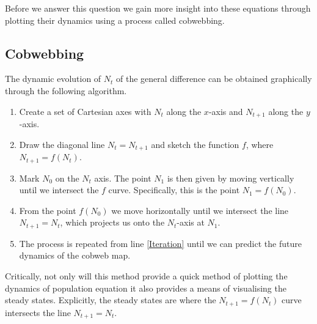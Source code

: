 Before we answer this question we gain more insight into these equations through plotting their dynamics using a process called cobwebbing.

\subsection{Cobwebbing}
The dynamic evolution of $N_t$ of the general difference  can be obtained graphically through the following algorithm.
\begin{enumerate}
\item Create a set of Cartesian axes with $N_t$ along the $x$-axis and $N_{t+1}$ along the $y$-axis.
\item Draw the diagonal line $N_t=N_{t+1}$ and sketch the function $f$, where $N_{t+1}=f(N_t)$.
\item Mark $N_0$ on the $N_t$ axis. The point $N_1$ is then given by moving vertically until we intersect the $f$ curve. Specifically, this is the point $N_1=f(N_0)$.\label{Iteration}
\item From the point $f(N_0)$ we move horizontally until we intersect the line $N_{t+1} = N_t$, which projects us onto the $N_t$-axis at $N_1$.
\item The process is repeated from line \ref{Iteration} until we can predict the future dynamics of the cobweb map.
\end{enumerate}
Critically, not only will this method provide a quick method of plotting the dynamics of population equation it also provides a means of visualising the steady states. Explicitly, the steady states are where the $N_{t+1}=f(N_t)$ curve intersects the line $N_{t+1} = N_t$.

